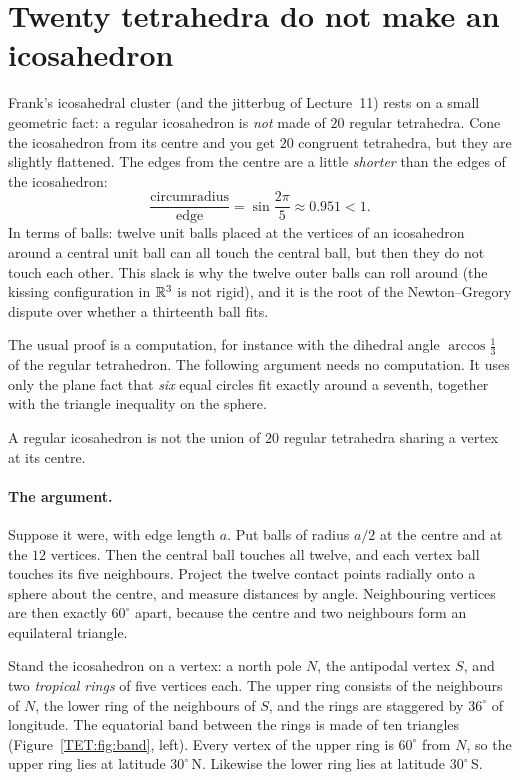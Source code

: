 
\section{Twenty tetrahedra do not make an icosahedron}
\label{TET:sec}

Frank's icosahedral cluster (and the jitterbug of Lecture~11) rests on a small geometric fact: a regular
icosahedron is \emph{not} made of $20$ regular tetrahedra. Cone the icosahedron from its centre and
you get $20$ congruent tetrahedra, but they are slightly flattened. The edges from the centre are a
little \emph{shorter} than the edges of the icosahedron:
\[
  \frac{\text{circumradius}}{\text{edge}}=\sin\frac{2\pi}{5}\approx0.951<1 .
\]
In terms of balls: twelve unit balls placed at the vertices of an icosahedron around a central unit
ball can all touch the central ball, but then they do not touch each other. This slack is why the
twelve outer balls can roll around (the kissing configuration in $\mathbb{R}^3$ is not rigid), and it is the
root of the Newton--Gregory dispute over whether a thirteenth ball fits.

The usual proof is a computation, for instance with the dihedral angle $\arccos\frac13$ of the regular
tetrahedron. The following argument needs no computation. It uses only the plane fact that \emph{six}
equal circles fit exactly around a seventh, together with the triangle inequality on the sphere.

\begin{proposition}\label{TET:prop}
A regular icosahedron is not the union of $20$ regular tetrahedra sharing a vertex at its centre.
\end{proposition}

\paragraph{The argument.} Suppose it were, with edge length $a$. Put balls of radius $a/2$ at the centre
and at the $12$ vertices. Then the central ball touches all twelve, and each vertex ball touches its
five neighbours. Project the twelve contact points radially onto a sphere about the centre, and
measure distances by angle. Neighbouring vertices are then exactly $60^\circ$ apart, because the centre
and two neighbours form an equilateral triangle.

Stand the icosahedron on a vertex: a north pole $N$, the antipodal vertex $S$, and two
\emph{tropical rings} of five vertices each. The upper ring consists of the neighbours of $N$, the
lower ring of the neighbours of $S$, and the rings are staggered by $36^\circ$ of longitude. The equatorial
band between the rings is made of ten triangles (Figure~\ref{TET:fig:band}, left). Every vertex of the
upper ring is $60^\circ$ from $N$, so the upper ring lies at latitude $30^\circ$\,N. Likewise the lower ring
lies at latitude $30^\circ$\,S.

